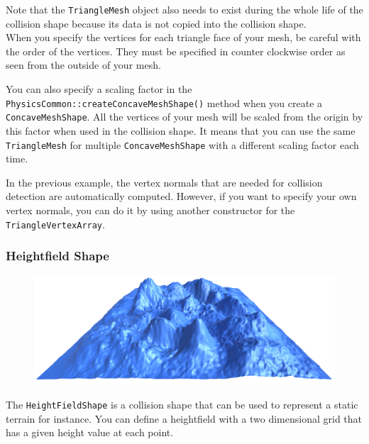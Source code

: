 \documentclass[a4paper,12pt]{article}
\begin{document}
  \vspace{0.6cm}

  Note that the \texttt{TriangleMesh} object also needs to exist during the whole life of the collision shape because its
  data is not copied into the collision shape. \\

  When you specify the vertices for each triangle face of your mesh, be careful with the order of the vertices. They must be specified in counter
  clockwise order as seen from the outside of your mesh. \\

  \begin{sloppypar}
  You can also specify a scaling factor in the \texttt{PhysicsCommon::createConcaveMeshShape()} method when you create a
  \texttt{Concave\allowbreak MeshShape}.
  All the vertices of your mesh will be scaled from the origin by this factor when used in the collision shape. It means that you can use the same
  \texttt{TriangleMesh} for multiple \texttt{ConcaveMeshShape} with a different scaling factor each time. \\
  \end{sloppypar}

  In the previous example, the vertex normals that are needed for collision detection are automatically computed. However, if you want to specify your own
  vertex normals, you can do it by using another constructor for the \texttt{TriangleVertexArray}. \\

  \subsubsection{Heightfield Shape}

  \begin{figure}[h]
      \centering
      \includegraphics{heightfieldshape.png}
      \label{fig:heightfieldshape}
  \end{figure}

  The \texttt{HeightFieldShape} is a collision shape that can be used to represent a static terrain for instance. You can
  define a heightfield with a two dimensional grid that has a given height value at each point. \\
\end{document}
